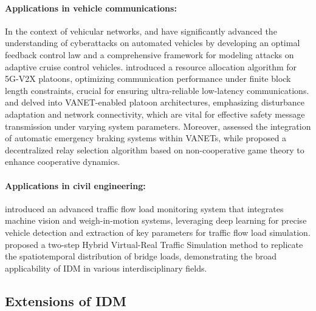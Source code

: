 \documentclass[a4paper,fleqn]{cas-sc}
\begin{document}
\paragraph{\textbf{Applications in vehicle communications:}}

In the context of vehicular networks,  \cite{wangOptimalFeedbackControlLaw2023a} and \cite{wang_analytical_2024} have significantly advanced the understanding of cyberattacks on automated vehicles by developing an optimal feedback control law and a comprehensive framework for modeling attacks on adaptive cruise control vehicles. \cite{dongDynamicManagerSelectionAssisted2022a} introduced a resource allocation algorithm for 5G-V2X platoons, optimizing communication performance under finite block length constraints, crucial for ensuring ultra-reliable low-latency communications. \cite{jiaDisturbanceAdaptiveDesignVANETenabledVehicle2014a} and \cite{jiaNetworkConnectivityPlatoonBasedVehicular2014a} delved into VANET-enabled platoon architectures, emphasizing disturbance adaptation and network connectivity, which are vital for effective safety message transmission under varying system parameters. Moreover,  \cite{segataAutomaticEmergencyBrakingRealistic2013a} assessed the integration of automatic emergency braking systems within VANETs, while \cite{tianSelfOrganizedRelaySelectionCooperative2017a} proposed a decentralized relay selection algorithm based on non-cooperative game theory to enhance cooperative dynamics. 


\paragraph{\textbf{Applications in civil engineering:}}
 \cite{ge_intelligent_2022} introduced an advanced traffic flow load monitoring system that integrates machine vision and weigh-in-motion  systems, leveraging deep learning for precise vehicle detection and extraction of key parameters for traffic flow load simulation.  \cite{zhou_hybrid_2024} proposed a two-step Hybrid Virtual-Real Traffic Simulation method to replicate the spatiotemporal distribution of bridge loads, demonstrating the broad applicability of IDM in various interdisciplinary fields.


\subsection{Extensions of IDM}
\end{document}
